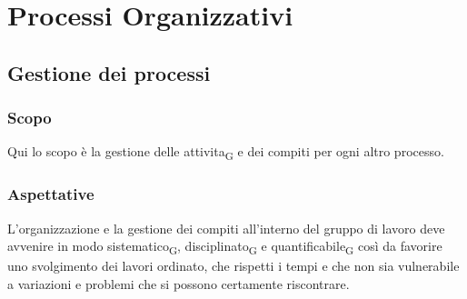 \section{Processi Organizzativi}
\label{organizzativi}

\subsection{Gestione dei processi}
    \subsubsection{Scopo}
    Qui lo scopo è la gestione delle attivita\textsubscript{G} e dei compiti per ogni altro processo.
    \subsubsection{Aspettative}
    L'organizzazione e la gestione dei compiti all'interno del gruppo di lavoro deve avvenire in modo sistematico\textsubscript{G}, disciplinato\textsubscript{G} e quantificabile\textsubscript{G} così da favorire uno svolgimento dei lavori ordinato, che rispetti i tempi e che non sia vulnerabile a variazioni e problemi che si possono certamente riscontrare.
